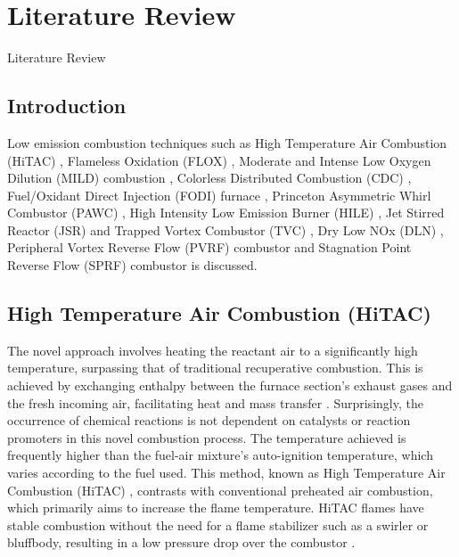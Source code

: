 \chapter[Literature Review]{Literature Review}{Literature Review}\label{CH2:LTR}

\section{Introduction}
Low emission combustion techniques such as High Temperature Air Combustion (HiTAC) \cite{CHOI1998,WEBER2020115551,weinberg1971combustion,GuptaHiTAC1999,HiTAC2002,Gupta25280,Gupta1610009,Gupta2436558,LILLE2005373,Mortberg7899,Yang499168}, Flameless Oxidation (FLOX) \cite{wunning2006combustion,WUNNING199781,meier2007flox,COLORADO20102443,LAMMEL4001825}, Moderate and Intense Low Oxygen Dilution (MILD) combustion \cite{CAVALIERE2004329,SZEGO2009429,EFFUGGI302356,EFFUGGI41368,KUMAR20052613,WEBER20052623,DALLY2004418}, Colorless Distributed Combustion (CDC) \cite{VA2011,VAThesis2011,ARGHODE201129,ARGHODE2012822,ARGHODE2013930,ARGHODE20116292,ARGHODE20101631,ARGHODE20111096}, Fuel/Oxidant Direct Injection (FODI) furnace \cite{He2008FlamelessCO,SOBIESIAK199893}, Princeton Asymmetric Whirl Combustor (PAWC) \cite{RHODE60127, YETTER20001265}, High Intensity Low Emission Burner (HILE) \cite{KUMAR20021131}, Jet Stirred Reactor (JSR) \cite{RUTAR20002435} and Trapped Vortex Combustor (TVC) \cite{TVC5266}, Dry Low NOx (DLN) \cite{Vandervort1362661}, Peripheral Vortex Reverse Flow (PVRF) combustor \cite{AHMAD2021100754, AHMAD2023101200,GUPTA2020116766,SOOD2020052302} and Stagnation Point Reverse Flow (SPRF) combustor \cite{bobba2006characteristics,bobba2008SPRF,CJNYJS91338,gopalakrishnan2007effects,DUWIG2014256} is discussed.

\section{High Temperature Air Combustion (HiTAC)}
The novel approach involves heating the reactant air to a significantly high temperature, surpassing that of traditional recuperative combustion. This is achieved by exchanging enthalpy between the furnace section's exhaust gases and the fresh incoming air, facilitating heat and mass transfer \cite{weinberg1971combustion}. Surprisingly, the occurrence of chemical reactions is not dependent on catalysts or reaction promoters in this novel combustion process. The temperature achieved is frequently higher than the fuel-air mixture's auto-ignition temperature, which varies according to the fuel used. This method, known as High Temperature Air Combustion (HiTAC) \cite{WEBER2020115551}, contrasts with conventional preheated air combustion, which primarily aims to increase the flame temperature. HiTAC flames have stable combustion without the need for a flame stabilizer such as a swirler or bluffbody, resulting in a low pressure drop over the combustor \cite{VAThesis2011}.

